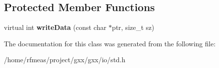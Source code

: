 \subsection*{Protected Member Functions}
\begin{DoxyCompactItemize}
\item 
virtual int {\bfseries write\+Data} (const char $\ast$ptr, size\+\_\+t sz)\hypertarget{classgxx_1_1io_1_1std__ostream__writer_aeb95cdb6085a6c306ba06e668a7e90dd}{}\label{classgxx_1_1io_1_1std__ostream__writer_aeb95cdb6085a6c306ba06e668a7e90dd}

\end{DoxyCompactItemize}


The documentation for this class was generated from the following file\+:\begin{DoxyCompactItemize}
\item 
/home/rfmeas/project/gxx/gxx/io/std.\+h\end{DoxyCompactItemize}
